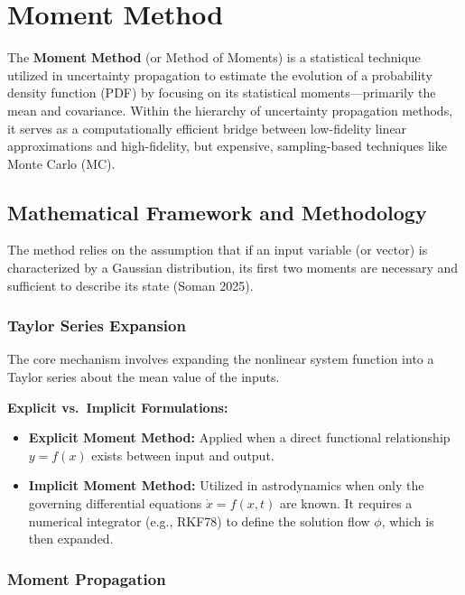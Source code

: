 \documentclass[
  letterpaper,
  DIV=11,
  numbers=noendperiod,
  oneside]{scrartcl}
\begin{document}
\section{Moment Method}\label{sec-moment-method}

The \textbf{Moment Method} (or Method of Moments) is a statistical
technique utilized in uncertainty propagation to estimate the evolution
of a probability density function (PDF) by focusing on its statistical
moments---primarily the mean and covariance. Within the hierarchy of
uncertainty propagation methods, it serves as a computationally
efficient bridge between low-fidelity linear approximations and
high-fidelity, but expensive, sampling-based techniques like Monte Carlo
(MC).

\subsection{Mathematical Framework and
Methodology}\label{mathematical-framework-and-methodology}

The method relies on the assumption that if an input variable (or
vector) is characterized by a Gaussian distribution, its first two
moments are necessary and sufficient to describe its state (Soman 2025).

\subsubsection{Taylor Series Expansion}\label{taylor-series-expansion}

The core mechanism involves expanding the nonlinear system function into
a Taylor series about the mean value of the inputs.

\textbf{Explicit vs.~Implicit Formulations:}

\begin{itemize}
\item
  \textbf{Explicit Moment Method:} Applied when a direct functional
  relationship \(y = f(x)\) exists between input and output.
\item
  \textbf{Implicit Moment Method:} Utilized in astrodynamics when only
  the governing differential equations \(\dot{x} = f(x, t)\) are known.
  It requires a numerical integrator (e.g., RKF78) to define the
  solution flow \(\phi\), which is then expanded.
\end{itemize}

\subsubsection{Moment Propagation}\label{moment-propagation}
\end{document}
